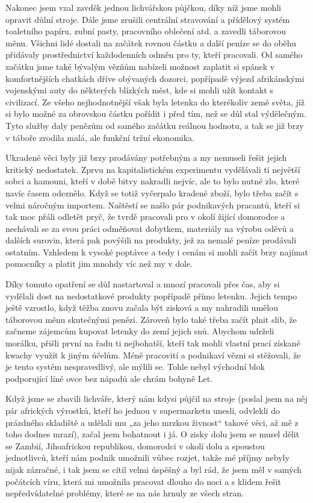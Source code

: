 Nakonec jsem vzal zavděk jednou lichvářskou půjčkou, díky níž jsme mohli opravit důlní stroje. Dále jsme zrušili centrální stravování a přídělový systém toaletního papíru, zubní pasty, pracovního oblečení atd. a zavedli táborovou měnu. Všichni lidé dostali na začátek rovnou částku a další peníze se do oběhu přidávaly prostřednictví každodenních odměn pro ty, kteří pracovali. Od samého začátku jsme také bývalým vězňům nabízeli možnost zaplatit si spánek v komfortnějších chatkách dříve obývaných dozorci, popřípadě výjezd afrikánskými vojenskými auty do některých blízkých měst, kde si mohli užít kontakt s civilizací. Ze všeho nejhodnotnější však byla letenka do kterékoliv země světa, jíž si bylo možné za obrovskou částku pořídit i před tím, než se důl stal výdělečným. Tyto služby daly penězům od samého začátku reálnou hodnotu, a tak se již brzy v táboře zrodila malá, ale funkční tržní ekonomika.

Ukradené věci byly již brzy prodávány potřebným a my nemuseli řešit jejich kritický nedostatek. Zprvu na kapitalistickém experimentu vydělávali ti největší sobci a hamouni, kteří v době bitvy nakradli nejvíc, ale to bylo nutné zlo, které navíc časem odeznělo. Když se totiž vyčerpalo kradené zboží, bylo třeba začít s velmi náročným importem. Naštěstí se našlo pár podnikavých pracantů, kteří si tak moc přáli odletět pryč, že tvrdě pracovali pro v okolí žijící domorodce a nechávali se za svou práci odměňovat dobytkem, materiály na výrobu oděvů a dalších surovin, která pak povýšili na produkty, jež za nemalé peníze prodávali ostatním. Vzhledem k vysoké poptávce a tedy i cenám si mohli začít brzy najímat pomocníky a platit jim mnohdy víc než my v dole.

 Díky tomuto opatření se důl nastartoval a mnozí pracovali přes čas, aby si vydělali dost na nedostatkové produkty popřípadě přímo letenku. Jejich tempo ještě vzrostlo, když těžba znovu začala být zisková a my nahradili umělou táborovou měnu skutečnými penězi. Zároveň bylo také třeba začít plnit slib, že začneme zájemcům kupovat letenky do zemí jejich snů. Abychom udrželi morálku, přišli první na řadu ti nejbohatší, kteří tak mohli vlastní prací získané kwachy využít k jiným účelům. Méně pracovití a podnikaví vězni si stěžovali, že je tento systém nespravedlivý, ale mýlili se. Tohle nebyl východní blok podporující líné ovce bez nápadů ale chrám bohyně Let.
 
Když jsme se zbavili lichváře, který nám kdysi půjčil na stroje (poslal jsem na něj pár afrických výrostků, kteří ho jednou v supermarketu unesli, odvlekli do prázdného skladiště a udělali mu „za jeho mrzkou živnost“ takové věci, až mě z toho dodnes mrazí), začal jsem bohatnout i já. O zisky dolu jsem se musel dělit se Zambií, Jihoafrickou republikou, domorodci v okolí dolu a spoustou jednotlivců, kteří nám podnik umožnili vůbec rozjet, takže mé příjmy nebyly nijak zázračné, i tak jsem se cítil velmi úspěšný a byl rád, že jsem měl v samých počátcích víru, která mi umožnila pracovat dlouho do noci a s klidem řešit nepředvídatelné problémy, které se na nás hrnuly ze všech stran. 
 
